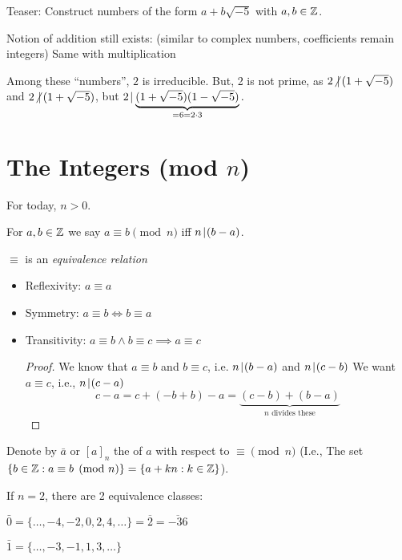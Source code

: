 \documentclass[notes.tex]{subfiles}
\begin{document}

Teaser: Construct numbers of the form $a+b\sqrt{-5}$ with $a, b\in\mathbb{Z}$.

Notion of addition still exists: (similar to complex numbers, coefficients remain integers)
Same with multiplication

Among these ``numbers'', $2$ is irreducible. But, 2 is not prime, as $2\mkern1mu{\not{|}}\mkern3mu (1+\sqrt{-5})$ and $2\mkern1mu{\not{|}}\mkern3mu(1+\sqrt{-5})$, but $2\mkern2mu|\mkern1mu \underbrace{(1+\sqrt{-5})(1-\sqrt{-5})}_{=6 = 2\cdot 3}.$


\chapter{The Integers (mod $n$)}

For today, $n>0$.

\begin{definition}
	For $a, b\in\mathbb{Z}$ we say $a\equiv b \pmod n$ iff $n\mkern2mu|\mkern1mu(b-a)$.
\end{definition}

$\equiv$ is an \emph{equivalence relation}

\begin{itemize}
	\item Reflexivity: $a\equiv a$
	\item Symmetry: $a\equiv b \iff b\equiv a$
	\item Transitivity: $a\equiv b \land b\equiv c \implies a \equiv c$
	\begin{proof}
	We know that $a\equiv b$ and $b\equiv c$, i.e. $n\mkern2mu|\mkern1mu (b-a)$ and $n\mkern2mu|\mkern1mu (c-b)$
	We want $a\equiv c$, i.e., $n\mkern2mu|\mkern1mu(c-a)$
	\[
		c-a = c+ (-b + b) - a = \underbrace{(c-b) + (b-a)}_{n\text{  divides these}}
	\]
	\end{proof}
\end{itemize}

\begin{definition}
	Denote by $\bar a$ or $[a]_n$ the  of $a$ with respect to $\equiv\pmod n$
	(I.e., The set $\{b\in\mathbb{Z}:a\equiv b\pmod n\} = \{a+kn:k\in\mathbb{Z}\}$).
\end{definition}

\begin{eg}
	If $n=2$, there are 2 equivalence classes:

	$\bar 0 = \{\ldots, -4, -2, 0, 2, 4, \ldots \} = \overline{2} = \overline{-36}$

	$\bar 1 = \{\ldots, -3, -1, 1, 3, \ldots\}$
\end{eg}
\end{document}

